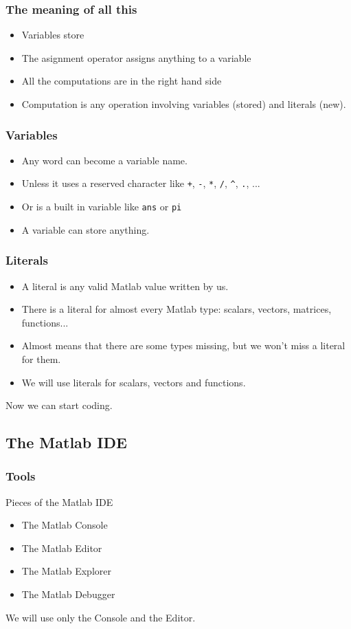 \documentclass[12pt]{beamer}
\begin{document}
\begin{frame}
  \frametitle{The meaning of all this}
  \begin{itemize}
  \item Variables store
  \item The asignment operator assigns anything to a variable
  \item All the computations are in the right hand side
  \item Computation is any operation involving variables (stored) and
    literals (new).
  \end{itemize}
\end{frame}

\begin{frame}
  \frametitle{Variables}
  \begin{itemize}
  \item Any word can become a variable name.
  \item Unless it uses a reserved character like \texttt{+},
    \texttt{-}, \texttt{*}, \texttt{/}, \texttt{\^}, \texttt{.}, ...
  \item Or is a built in variable like \texttt{ans} or \texttt{pi}
  \item A variable can store anything.
  \end{itemize}
\end{frame}

\begin{frame}
  \frametitle{Literals}
  \begin{itemize}
  \item A literal is any valid Matlab value written by us.
  \item There is a literal for almost every Matlab type: scalars,
    vectors, matrices, functions...
  \item Almost means that there are some types missing, but we won't
    miss a literal for them.
  \item We will use literals for scalars, vectors and functions.
  \end{itemize}
Now we can start coding.
\end{frame}

\subsection{The Matlab IDE}
\begin{frame}
  \frametitle{Tools}
Pieces of the Matlab IDE
\begin{itemize}
\item The Matlab Console
\item The Matlab Editor
\item The Matlab Explorer
\item The Matlab Debugger
\end{itemize}
We will use only the Console and the Editor.
\end{frame}
\end{document}
